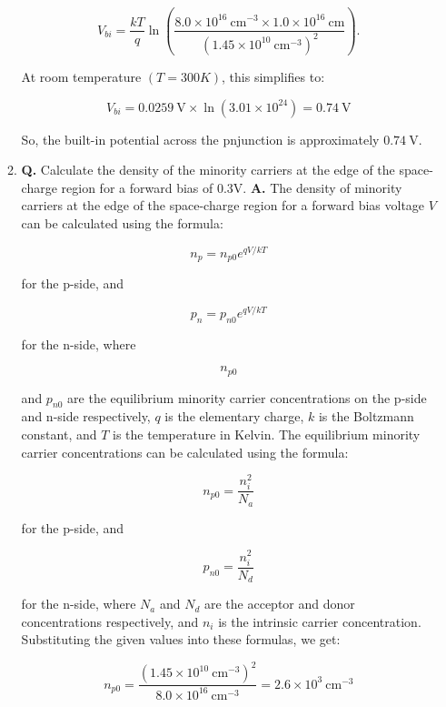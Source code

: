 \documentclass[main.tex]{subfiles}
\begin{document}
\begin{enumerate}
\begin{enumerate}
        $$
        V_{b i}=\frac{k T}{q} \ln \left(\frac{8.0 \times 10^{16} \mathrm{~cm}^{-3} \times 1.0 \times 10^{16} \mathrm{~cm}}{\left(1.45 \times 10^{10} \mathrm{~cm}^{-3}\right)^2}\right).
        $$

        At room temperature $(T=300 K)$, this simplifies to:
        
        $$
        V_{b i}=0.0259 \mathrm{~V} \times \ln \left(3.01 \times 10^{24}\right)=0.74 \mathrm{~V}
        $$
        
        So, the built-in potential across the pnjunction is approximately $0.74 \mathrm{~V}$.
        
        \item \textbf{Q.} Calculate the density of the minority carriers at the edge of the space-charge region for a forward bias of 0.3V. \textbf{A.} The density of minority carriers at the edge of the space-charge region for a forward bias voltage $V$ can be calculated using the formula:
        
        $$
        n_p=n_{p 0} e^{q V / k T}
        $$
        
        for the $\mathrm{p}$-side, and
        
        $$
        p_n=p_{n 0} e^{q V / k T}
        $$
        
        for the $\mathrm{n}$-side, where
        
        $$
        n_{p 0}
        $$
        
        and $p_{n 0}$ are the equilibrium minority carrier concentrations on the $\mathrm{p}$-side and $\mathrm{n}$-side respectively, $q$ is the elementary charge, $k$ is the Boltzmann constant, and $T$ is the temperature in Kelvin. The equilibrium minority carrier concentrations can be calculated using the formula:
        
        $$
        n_{p 0}=\frac{n_i^2}{N_a}
        $$
        
        for the $\mathrm{p}$-side, and
        
        $$
        p_{n 0}=\frac{n_i^2}{N_d}
        $$
        
        for the $\mathrm{n}$-side, where $N_a$ and $N_d$ are the acceptor and donor concentrations respectively, and $n_i$ is the intrinsic carrier concentration. Substituting the given values into these formulas, we get:
        
        $$
        n_{p 0}=\frac{\left(1.45 \times 10^{10} \mathrm{~cm}^{-3}\right)^2}{8.0 \times 10^{16} \mathrm{~cm}^{-3}}=2.6 \times 10^3 \mathrm{~cm}^{-3}
        $$
        

\end{enumerate}
\end{enumerate}
\end{document}
